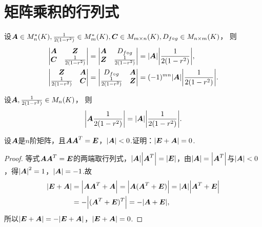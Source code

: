 \section{矩阵乘积的行列式}
\begin{lemma}
设\(\A\in M_n^*(K),
\B\in M_m^*(K),
\C\in M_{m\times n}(K),
\D\in M_{n\times m}(K)\)，
则\begin{align}
	\begin{vmatrix}
		\A & \z \\
		\C & \B
	\end{vmatrix}
	&= \begin{vmatrix}
		\A & \D \\
		\z & \B
	\end{vmatrix}
	= \abs{\A} \abs{\B}, \label{equation:行列式.广义三角阵的行列式1} \\
	\begin{vmatrix}
		\z & \A \\
		\B & \C
	\end{vmatrix}
	&= \begin{vmatrix}
		\D & \A \\
		\B & \z
	\end{vmatrix}
	= (-1)^{mn} \abs{\A} \abs{\B}. \label{equation:行列式.广义三角阵的行列式2}
\end{align}
\end{lemma}

\begin{theorem}[矩阵乘积的行列式定理]\label{theorem:行列式.矩阵乘积的行列式}
设\(\A,\B\in M_n(K)\)，
则\begin{equation}
\abs{\A\B} = \abs{\A} \abs{\B}.
\end{equation}
\end{theorem}

\begin{example}
设\(\A\)是\(n\)阶矩阵，且\(\A\A^T = \E\)，\(\abs{\A}<0\).证明：\(\abs{\E+\A}=0\).
\begin{proof}
等式\(\A\A^T=\E\)的两端取行列式，\(\abs{\A} \abs{\A^T} = \abs{\E}\)，由\(\abs{\A} = \abs{\A^T}\)与\(\abs{\A} < 0\)，得\(\abs{\A}^2 = 1\)，\(\abs{\A} = -1\).故\begin{align*}
\abs{\E+\A}
&= \abs{\A\A^T+\A}
= \abs{\A(\A^T+\E)}
= \abs{\A} \abs{\A^T+\E} \\
&= -\abs{(\A^T+\E)^T}
= -\abs{\A+\E},
\end{align*}所以\(\abs{\E+\A} = -\abs{\E+\A}\)，\(\abs{\E+\A}=0\).
\end{proof}
\end{example}

